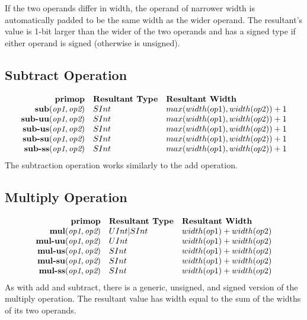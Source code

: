 \documentclass[12pt]{article}
\begin{document}
If the two operands differ in width, the operand of narrower width is automatically padded to be the same width as the wider operand.
The resultant's value is 1-bit larger than the wider of the two operands and has a signed type if either operand is signed (otherwise is unsigned).

\subsection{Subtract Operation}
\[
\begin{array}{rll}
\text{\bf primop} & \text{\bf Resultant Type} & \text{\bf Resultant Width} \\
\text{\bf sub}(   \text{\em op1}, \text{\em op2}) &  SInt & max(width(op1),width(op2)) + 1  \\
\text{\bf sub-uu}(\text{\em op1}, \text{\em op2}) &  SInt & max(width(op1),width(op2)) + 1  \\
\text{\bf sub-us}(\text{\em op1}, \text{\em op2}) &  SInt & max(width(op1),width(op2)) + 1  \\
\text{\bf sub-su}(\text{\em op1}, \text{\em op2}) &  SInt & max(width(op1),width(op2)) + 1  \\
\text{\bf sub-ss}(\text{\em op1}, \text{\em op2}) &  SInt & max(width(op1),width(op2)) + 1  \\
\end{array}
\]
The subtraction operation works similarly to the add operation.

\subsection{Multiply Operation}
\[
\begin{array}{rll}
\text{\bf primop} & \text{\bf Resultant Type} & \text{\bf Resultant Width} \\
\text{\bf mul}(   \text{\em op1}, \text{\em op2}) & UInt|SInt & width(op1) + width(op2)  \\
\text{\bf mul-uu}(\text{\em op1}, \text{\em op2}) &   UInt & width(op1) + width(op2)  \\
\text{\bf mul-us}(\text{\em op1}, \text{\em op2}) &   SInt & width(op1) + width(op2)  \\
\text{\bf mul-su}(\text{\em op1}, \text{\em op2}) &   SInt & width(op1) + width(op2)  \\
\text{\bf mul-ss}(\text{\em op1}, \text{\em op2}) &   SInt & width(op1) + width(op2)  \\
\end{array}
\]
As with add and subtract, there is a generic, unsigned, and signed version of the multiply operation.
The resultant value has width equal to the sum of the widths of its two operands.
\end{document}
